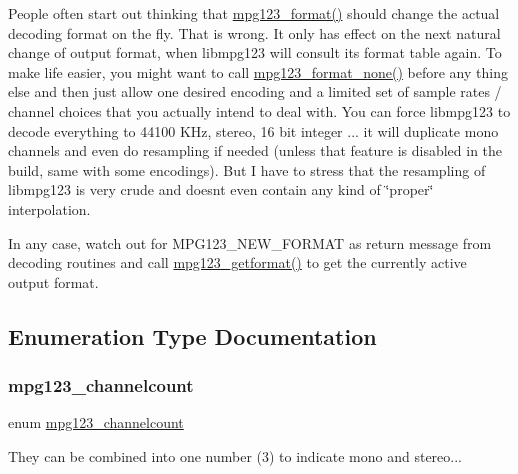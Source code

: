 People often start out thinking that \hyperlink{group__mpg123__output_ga9e614a7d7c1de12e981d8f7add9a2d4b}{mpg123\+\_\+format()} should change the actual decoding format on the fly. That is wrong. It only has effect on the next natural change of output format, when libmpg123 will consult its format table again. To make life easier, you might want to call \hyperlink{group__mpg123__output_gae05ab0b542b5172291ee5fdc4a385cb9}{mpg123\+\_\+format\+\_\+none()} before any thing else and then just allow one desired encoding and a limited set of sample rates / channel choices that you actually intend to deal with. You can force libmpg123 to decode everything to 44100 K\+Hz, stereo, 16 bit integer ... it will duplicate mono channels and even do resampling if needed (unless that feature is disabled in the build, same with some encodings). But I have to stress that the resampling of libmpg123 is very crude and doesn\textquotesingle{}t even contain any kind of \char`\"{}proper\char`\"{} interpolation.

In any case, watch out for M\+P\+G123\+\_\+\+N\+E\+W\+\_\+\+F\+O\+R\+M\+AT as return message from decoding routines and call \hyperlink{group__mpg123__output_ga47557e1d8d1b31ae4fd49ad4c54458ab}{mpg123\+\_\+getformat()} to get the currently active output format. 

\subsection{Enumeration Type Documentation}
\mbox{\label{group__mpg123__output_ga94df916cae2fc81b8a6df88c1728eb1c}} 
\subsubsection{\texorpdfstring{mpg123\+\_\+channelcount}{mpg123\_channelcount}\hspace{0.1cm}{\footnotesize\ttfamily [1/2]}}
{\footnotesize\ttfamily enum \hyperlink{group__mpg123__output_ga94df916cae2fc81b8a6df88c1728eb1c}{mpg123\+\_\+channelcount}}

They can be combined into one number (3) to indicate mono and stereo... \mbox{\label{group__mpg123__output_ga94df916cae2fc81b8a6df88c1728eb1c}} 

